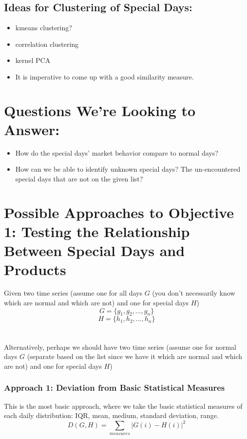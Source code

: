 \documentclass[11pt]{paper}
\begin{document}
\subsection{Ideas for Clustering of Special Days:}
\begin{itemize}
\setlength{\itemsep}{0pt}
  \setlength{\parskip}{0pt}
\item kmeans clustering?
\item correlation clustering
\item kernel PCA
\item It is imperative to come up with a good similarity measure.
\end{itemize}

\section{Questions We're Looking to Answer:}
\begin{itemize}
\setlength{\itemsep}{0pt}
  \setlength{\parskip}{0pt}
\item How do the special days' market behavior compare to normal days?
\item How can we be able to identify unknown special days? The un-encountered special days that are not on the given list?

\end{itemize}


\newpage


\section*{Possible Approaches to Objective 1: Testing the Relationship Between Special Days and Products}
Given two time series (assume one for all days $G$ (you don't necessarily know which are normal and which are not) and one for special days $H$)
$$G = \{g_1, g_2, ..., g_n\}$$
$$H = \{h_1, h_2, ..., h_n\}$$
\\\\Alternatively, perhaps we should have two time series (assume one for normal days $G$ (separate based on the list since we have it which are normal and which are not) and one for special days $H$)

\subsubsection*{Approach 1: Deviation from Basic Statistical Measures}
This is the most basic approach, where we take the basic statistical measures of each daily distribution: IQR, mean, medium, standard deviation, range.
$$D(G,H) = \sum_{measures} |G(i) - H(i)|^2$$
\end{document}
